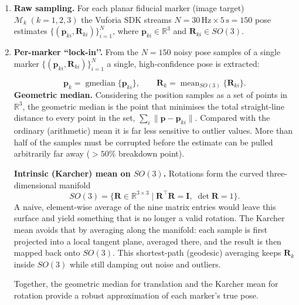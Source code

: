 \begin{enumerate}
    \item \textbf{Raw sampling.}\;
          For each planar fiducial marker (image target) $\mathcal M_k \;(k=1,2,3)$ the Vuforia SDK
          streams $N = 30\,\text{Hz}\times 5\,\text{s} = 150$ pose estimates
          \(\{(\mathbf p_{ki},\mathbf R_{ki})\}_{i=1}^{N}\), where
          \(\mathbf p_{ki} \in \mathbb R^{3}\) and
          \(\mathbf R_{ki}\in SO(3)\).
    
          \item \textbf{Per-marker “lock-in’’.}\;
          From the $N=150$ noisy pose samples of a single marker
          \(\{(\mathbf p_{ki},\mathbf R_{ki})\}_{i=1}^{N}\) a single,
          high-confidence pose is extracted:
    
          \[
            \mathbf p_k = \operatorname{gmedian}\bigl\{\mathbf p_{ki}\bigr\},
            \qquad
            \mathbf R_k = \operatorname{mean}_{SO(3)}\bigl\{\mathbf R_{ki}\bigr\}.
          \]
          \textbf{Geometric median.}  
          Considering the position samples as a set of points in $\mathbb R^{3}$,
          the geometric median is the point that minimises the total
          straight-line distance to every point in the set,
          \(\sum_i\|\mathbf p-\mathbf p_{ki}\|\).
          Compared with the ordinary (arithmetic) mean it is far less sensitive
          to outlier values. More than half of the samples must be
          corrupted before the estimate can be pulled arbitrarily far away
          (\(>50\%\) breakdown point).
    
        \textbf{Intrinsic (Karcher) mean on \(SO(3)\).}  
          Rotations form the curved three-dimensional manifold
          \[
            SO(3)=\{\mathbf R\!\in\!\mathbb R^{3\times3}\mid
                   \mathbf R^{\!\top}\mathbf R=\mathbf I,\;
                   \det\mathbf R=1\}.
          \]
          A naive, element-wise average of the nine matrix entries would leave
          this surface and yield something that is no longer a valid rotation.
          The Karcher mean avoids that by averaging along the manifold:
          each sample is first projected into a local tangent plane, averaged
          there, and the result is then mapped back onto \(SO(3)\).
          This shortest-path (geodesic) averaging keeps
          \(\mathbf R_k\) inside \(SO(3)\) while still damping out noise and
          outliers.
    
          Together, the geometric median for translation and the Karcher mean
          for rotation provide a robust approximation of each
          marker's true pose.
    

\end{enumerate}
